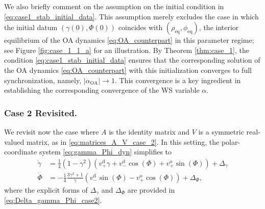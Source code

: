 \documentclass[10pt]{article}
\theoremstyle{definition}
\theoremstyle{definition}
\numberwithin{equation}{section}
\newcommand{\vDPlus}{v_+^{\text{d}}}
\newcommand{\vDMinus}{v_-^{\text{d}}}
\newcommand{\vOPlus}{v_+^{\text{o}}}
\newcommand{\eq}{\mathrm{eq}}
\newcommand{\DeltaGamma}{\Delta_{\gamma}}
\newcommand{\DeltaPhi}{\Delta_{\Phi}}
\newcommand{\rhoEq}{\rho_{\mathrm{eq}}}
\newcommand{\OA}{\mathrm{OA}}
\begin{document}
We also briefly comment on the assumption on the initial condition in \eqref{eq:case1_stab_initial_data}.
This assumption merely excludes the case in which the initial datum $(\gamma(0), \Phi(0))$ coincides with $(\rhoEq, \phi_{\eq})$, the interior equilibrium of the OA dynamics \eqref{eq:OA_counterpart} in this parameter regime; see Figure \ref{fig:case_1_1_a} for an illustration. By Theorem \ref{thm:case_1}, the condition \eqref{eq:case1_stab_initial_data} ensures that the corresponding solution of the OA dynamics \eqref{eq:OA_counterpart} with this initialization converges to full synchronization, namely, $|\alpha_{\OA}| \rightarrow 1$. This convergence is a key ingredient in establishing the corresponding convergence of the WS variable $\alpha$.



\subsubsection*{Case 2 Revisited.}
We revisit now the case where $A$ is the identity matrix and $V$ is a symmetric real-valued matrix, as in \eqref{eq:matrices_A_V_case_2}.
In this setting, the polar-coordinate system \eqref{eq:gamma_Phi_dyn} simplifies to
\begin{equation}\label{eq:alpha_pc_dyn_case2}
\begin{aligned}
\dot{\gamma} &= \frac{1}{4} \left( 1 - \gamma^2 \right) \left( \vDPlus \gamma + \vDMinus \cos (\Phi) + \vOPlus \sin (\Phi) \right) + \DeltaGamma\\[4pt]
\dot{\Phi} &= -\frac{1}{4} \frac{3\gamma^2 + 1}{\gamma} \left( \vDMinus \sin (\Phi) - \vOPlus \cos (\Phi) \right) + \DeltaPhi,
\end{aligned}
\end{equation}
where the explicit forms of $\DeltaGamma$ and $\DeltaPhi$ are provided in \eqref{eq:Delta_gamma_Phi_case2}.
\end{document}
